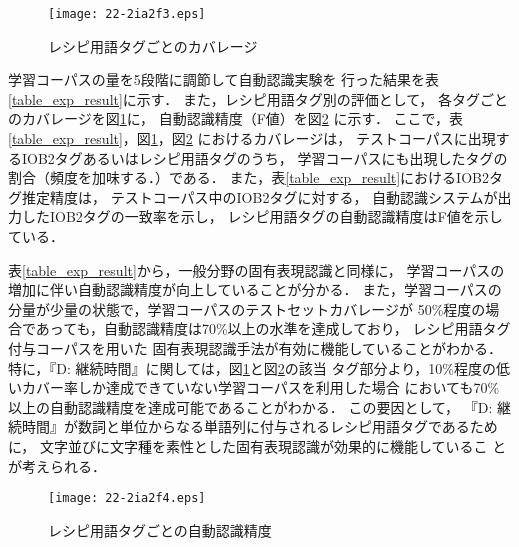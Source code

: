 \documentclass[japanese]{jnlp_1.4}
\begin{document}
\begin{figure}[t]
  \begin{center}
\texttt{[image: 22-2ia2f3.eps]}
  \end{center}
  \caption{レシピ用語タグごとのカバレージ}
  \label{graph_exp_cov}
\end{figure}

学習コーパスの量を5段階に調節して自動認識実験を
行った結果を表\ref{table_exp_result}に示す．
また，レシピ用語タグ別の評価として，
各タグごとのカバレージを図\ref{graph_exp_cov}に，
自動認識精度（F値）を図\ref{graph_exp_all}
に示す．
ここで，表\ref{table_exp_result}，図\ref{graph_exp_cov}，図\ref{graph_exp_all}
におけるカバレージは，
テストコーパスに出現するIOB2タグあるいはレシピ用語タグのうち，
学習コーパスにも出現したタグの割合（頻度を加味する．）である．
また，表\ref{table_exp_result}におけるIOB2タグ推定精度は，
テストコーパス中のIOB2タグに対する，
自動認識システムが出力したIOB2タグの一致率を示し，
レシピ用語タグの自動認識精度はF値を示している．

表\ref{table_exp_result}から，一般分野の固有表現認識と同様に，
学習コーパスの増加に伴い自動認識精度が向上していることが分かる．
また，学習コーパスの分量が少量の状態で，学習コーパスのテストセットカバレージが
50\%程度の場合であっても，自動認識精度は70\%以上の水準を達成しており，
レシピ用語タグ付与コーパスを用いた
固有表現認識手法が有効に機能していることがわかる．
特に，『D: 継続時間』に関しては，図\ref{graph_exp_cov}と図\ref{graph_exp_all}の該当
タグ部分より，10\%程度の低いカバー率しか達成できていない学習コーパスを利用した場合
においても70\%以上の自動認識精度を達成可能であることがわかる．
この要因として，
『D: 継続時間』が数詞と単位からなる単語列に付与されるレシピ用語タグであるために，
文字並びに文字種を素性とした固有表現認識が効果的に機能しているこ
とが考えられる．

\begin{figure}[t]
  \begin{center}
\texttt{[image: 22-2ia2f4.eps]}
  \end{center}
  \caption{レシピ用語タグごとの自動認識精度}
  \label{graph_exp_all}
\end{figure}
\end{document}

